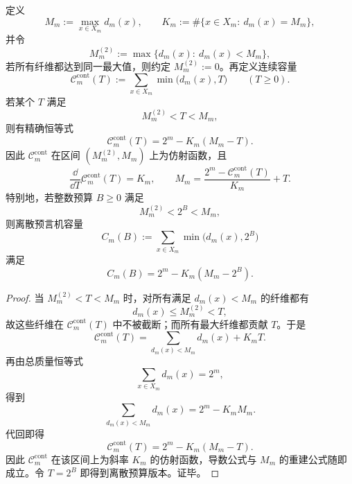 \begin{proposition}[最大纤维能级间隙强制容量曲线的精确仿射段]\label{prop:xi-time-part9t-top-gap-affine-capacity-segment}
定义
\[
M_m:=\max_{x\in X_m}d_m(x),
\qquad
K_m:=\#\{x\in X_m:\ d_m(x)=M_m\},
\]
并令
\[
M_m^{(2)}:=
\max\{d_m(x):\ d_m(x)<M_m\},
\]
若所有纤维都达到同一最大值，则约定 \(M_m^{(2)}:=0\)。再定义连续容量
\[
\mathcal C_m^{\mathrm{cont}}(T):=
\sum_{x\in X_m}\min\bigl(d_m(x),T\bigr)
\qquad (T\ge 0).
\]
若某个 \(T\) 满足
\[
M_m^{(2)}<T<M_m,
\]
则有精确恒等式
\[
\mathcal C_m^{\mathrm{cont}}(T)
=
2^m-K_m(M_m-T).
\]
因此 \(\mathcal C_m^{\mathrm{cont}}\) 在区间 \((M_m^{(2)},M_m)\) 上为仿射函数，且
\[
\frac{\dd}{\dd T}\mathcal C_m^{\mathrm{cont}}(T)=K_m,
\qquad
M_m=\frac{2^m-\mathcal C_m^{\mathrm{cont}}(T)}{K_m}+T.
\]
特别地，若整数预算 \(B\ge 0\) 满足
\[
M_m^{(2)}<2^B<M_m,
\]
则离散预言机容量
\[
C_m(B):=\sum_{x\in X_m}\min\bigl(d_m(x),2^B\bigr)
\]
满足
\[
C_m(B)=2^m-K_m(M_m-2^B).
\]
\end{proposition}
\begin{proof}
当 \(M_m^{(2)}<T<M_m\) 时，对所有满足 \(d_m(x)<M_m\) 的纤维都有
\[
d_m(x)\le M_m^{(2)}<T,
\]
故这些纤维在 \(\mathcal C_m^{\mathrm{cont}}(T)\) 中不被截断；而所有最大纤维都贡献 \(T\)。于是
\[
\mathcal C_m^{\mathrm{cont}}(T)
=
\sum_{d_m(x)<M_m}d_m(x)+K_mT.
\]
再由总质量恒等式
\[
\sum_{x\in X_m}d_m(x)=2^m,
\]
得到
\[
\sum_{d_m(x)<M_m}d_m(x)=2^m-K_mM_m.
\]
代回即得
\[
\mathcal C_m^{\mathrm{cont}}(T)=2^m-K_m(M_m-T).
\]
因此 \(\mathcal C_m^{\mathrm{cont}}\) 在该区间上为斜率 \(K_m\) 的仿射函数，导数公式与 \(M_m\) 的重建公式随即成立。令 \(T=2^B\) 即得到离散预算版本。证毕。
\end{proof}

